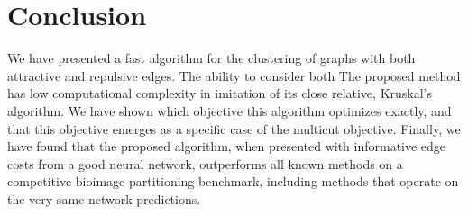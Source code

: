 
\section{Conclusion} \label{Conclusion}
We have presented a fast algorithm for the clustering of graphs with both attractive and repulsive edges. The ability to consider both
 The proposed method has low computational complexity in imitation of its close relative, Kruskal's algorithm. We have shown which objective this algorithm optimizes exactly, and that this objective emerges as a specific case of the multicut objective. 
Finally, we have found that the proposed algorithm, when presented with informative edge costs from a good neural network, outperforms all known methods on a competitive bioimage partitioning benchmark, including methods that operate on the very same network predictions. 




